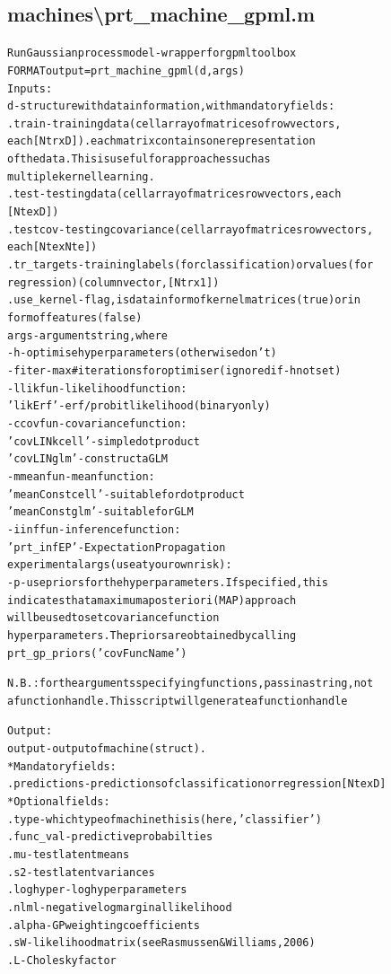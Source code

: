\subsection{machines\textbackslash prt\_machine\_gpml.m}
\begin{alltt}

 Run Gaussian process model - wrapper for gpml toolbox
 FORMAT output = prt\_machine\_gpml(d,args)
 Inputs:
   d         - structure with data information, with mandatory fields:
     .train      - training data (cell array of matrices of row vectors,
                   each [Ntr x D]). each matrix contains one representation
                   of the data. This is useful for approaches such as
                   multiple kernel learning.
     .test       - testing data  (cell array of matrices row vectors, each
                   [Nte x D])
     .testcov    - testing covariance (cell array of matrices row vectors,
                   each [Nte x Nte])
     .tr\_targets - training labels (for classification) or values (for
                   regression) (column vector, [Ntr x 1])
     .use\_kernel - flag, is data in form of kernel matrices (true) or in 
                   form of features (false)
    args     - argument string, where
       -h         - optimise hyperparameters (otherwise don't)
       -f iter    - max \# iterations for optimiser (ignored if -h not set)
       -l likfun  - likelihood function:
                       'likErf' - erf/probit likelihood (binary only)
       -c covfun  - covariance function:
                       'covLINkcell' - simple dot product
                       'covLINglm'   - construct a GLM
       -m meanfun - mean function:
                       'meanConstcell' - suitable for dot product
                       'meanConstglm'  - suitable for GLM
       -i inffun  - inference function:
                       'prt\_infEP' - Expectation Propagation
    experimental args (use at your own risk):
       -p         - use priors for the hyperparameters. If specified, this
                    indicates that a maximum a posteriori (MAP) approach
                    will be used to set covariance function
                    hyperparameters. The priors are obtained by calling
                    prt\_gp\_priors('covFuncName')
 
       N.B.: for the arguments specifying functions, pass in a string, not
       a function handle. This script will generate a function handle
 
 Output:
    output  - output of machine (struct).
     * Mandatory fields:
      .predictions - predictions of classification or regression [Nte x D]
     * Optional fields:
      .type     - which type of machine this is (here, 'classifier')
      .func\_val - predictive probabilties
      .mu       - test latent means
      .s2       - test latent variances
      .loghyper - log hyperparameters
      .nlml     - negative log marginal likelihood
      .alpha    - GP weighting coefficients
      .sW       - likelihood matrix (see Rasmussen \& Williams, 2006)
      .L        - Cholesky factor
\end{alltt}


